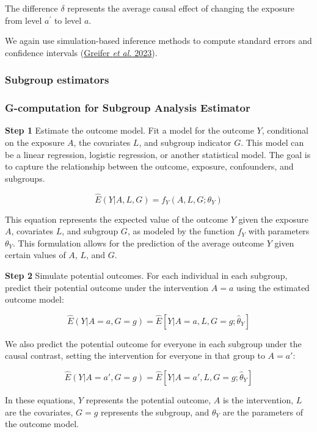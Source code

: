 \documentclass[
  singlecolumn]{article}
\begin{document}
The difference \(\delta\) represents the average causal effect of
changing the exposure from level \(a^{\prime}\) to level \(a\).

We again use simulation-based inference methods to compute standard
errors and confidence intervals (\hyperref[ref-greifer2023]{Greifer
\emph{et al.} 2023}).

\subsubsection{Subgroup estimators}\label{subgroup-estimators}

\subsubsection{\texorpdfstring{\textbf{G-computation for Subgroup
Analysis
Estimator}}{G-computation for Subgroup Analysis Estimator}}\label{g-computation-for-subgroup-analysis-estimator}

\textbf{Step 1} Estimate the outcome model. Fit a model for the outcome
\(Y\), conditional on the exposure \(A\), the covariates \(L\), and
subgroup indicator \(G\). This model can be a linear regression,
logistic regression, or another statistical model. The goal is to
capture the relationship between the outcome, exposure, confounders, and
subgroups.

\[ \hat{E}(Y|A,L,G) = f_Y(A,L,G; \theta_Y) \]

This equation represents the expected value of the outcome \(Y\) given
the exposure \(A\), covariates \(L\), and subgroup \(G\), as modeled by
the function \(f_Y\) with parameters \(\theta_Y\). This formulation
allows for the prediction of the average outcome \(Y\) given certain
values of \(A\), \(L\), and \(G\).

\textbf{Step 2} Simulate potential outcomes. For each individual in each
subgroup, predict their potential outcome under the intervention \(A=a\)
using the estimated outcome model:

\[\hat{E}(Y|A=a, G=g)  = \hat{E}[Y|A=a,L,G=g; \hat{\theta}_Y]\]

We also predict the potential outcome for everyone in each subgroup
under the causal contrast, setting the intervention for everyone in that
group to \(A=a'\):

\[\hat{E}(Y|A=a', G=g)  = \hat{E}[Y|A=a',L,G=g; \hat{\theta}_Y]\]

In these equations, \(Y\) represents the potential outcome, \(A\) is the
intervention, \(L\) are the covariates, \(G=g\) represents the subgroup,
and \(\theta_Y\) are the parameters of the outcome model.
\end{document}
